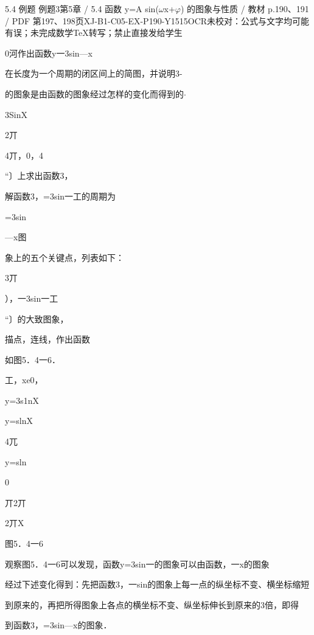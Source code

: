 \begin{bankitem}{5.4 例题 例题3}{第5章 / 5.4 函数 y=A sin(\ensuremath{\omega}x+\ensuremath{\varphi}) 的图象与性质 / 教材 p.190、191 / PDF 第197、198页}{XJ-B1-C05-EX-P190-Y1515}{OCR未校对：公式与文字均可能有误；未完成数学TeX转写；禁止直接发给学生}
\begin{ocrdraft}
\par
0河作出函数y一3sin—x
\par
在长度为一个周期的闭区间上的简图，并说明3-
\par
的图象是由函数的图象经过怎样的变化而得到的\ensuremath{\cdot}
\par
3SinX
\par
[教材p.191 / PDF第198页]
\par
2丌
\par
4丌，0，4
\par
“〕上求出函数3，
\par
解函数3，=3sin一工的周期为
\par
=3sin
\par
—x图
\par
象上的五个关键点，列表如下：
\par
3丌
\par
），一3sin一工
\par
“〕的大致图象，
\par
描点，连线，作出函数
\par
如图5．4一6．
\par
工，xe0，
\par
y=3s1nX
\par
y=slnX
\par
4兀
\par
y=sln
\par
0
\par
丌2丌
\par
2丌X
\par
图5．4一6
\par
观察图5．4一6可以发现，函数y=3sin一的图象可以由函数，一x的图象
\par
经过下述变化得到：先把函数3，一sin的图象上每一点的纵坐标不变、横坐标缩短
\par
到原来的，再把所得图象上各点的横坐标不变、纵坐标伸长到原来的3倍，即得
\par
到函数3，=3sin—x的图象．
\end{ocrdraft}
\end{bankitem}
